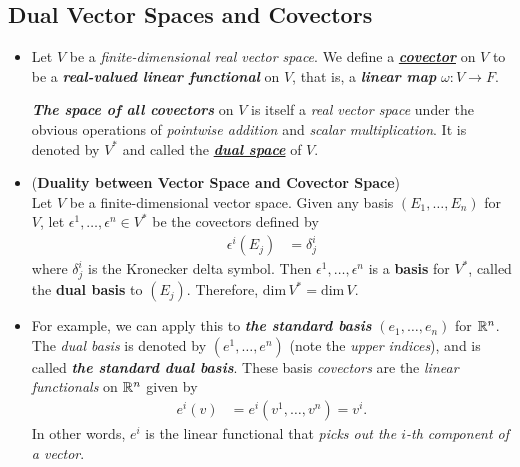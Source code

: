 \documentclass[11pt]{article}
\begin{document}
\subsection{Dual Vector Spaces and Covectors}
\begin{itemize}
\item \begin{definition}
Let $V$ be a \emph{finite-dimensional real vector space}. We define a \underline{\emph{\textbf{covector}}} on $V$ to be a \textbf{\emph{real-valued linear functional}} on $V$, that is, a \emph{\textbf{linear map}} $\omega: V \rightarrow F$.

\emph{\textbf{The space of all covectors}} on $V$ is itself a \emph{real vector space} under the obvious operations of \emph{pointwise addition} and \emph{scalar multiplication}. It is denoted by $V^{*}$ and called the \underline{\emph{\textbf{dual space}}} of $V$.
\end{definition}

\item \begin{proposition} (\textbf{Duality between Vector Space and Covector Space})\\
Let $V$ be a finite-dimensional vector space. Given any basis $(E_1,\ldots, E_n)$ for $V$, let $\epsilon^1, \ldots, \epsilon^n \in V^{*}$ be the covectors defined by 
\begin{align*}
\epsilon^{i}(E_{j}) &= \delta_{j}^{i}
\end{align*}
where $\delta_{j}^{i}$ is the Kronecker delta symbol. Then $\epsilon^1, \ldots, \epsilon^n$ is a \textbf{basis} for $V^{*}$, called the \textbf{dual basis} to $(E_j)$. Therefore, $\text{dim}\,V^{*} = \text{dim}\,V$.
\end{proposition}

\item \begin{example}
For example, we can apply this to \emph{\textbf{the standard basis}} $(e_1, \ldots, e_n)$ for ${\mathbb R}^n$. The \emph{dual basis} is denoted by $(e^1,\ldots,e^n)$ (note the \emph{upper indices}), and is called \emph{\textbf{the standard dual basis}}. These basis \emph{covectors} are the \emph{linear functionals} on ${\mathbb R}^n$ given by
\begin{align}
e^{i}(v) &= e^{i}(v^1,\ldots, v^{n}) = v^{i}. \label{eqn: covector_basis_vector_basis}
\end{align} In other words, $e^i$ is the linear functional that \emph{picks out the $i$-th component of a vector}. 


\end{example}
\end{itemize}
\end{document}
